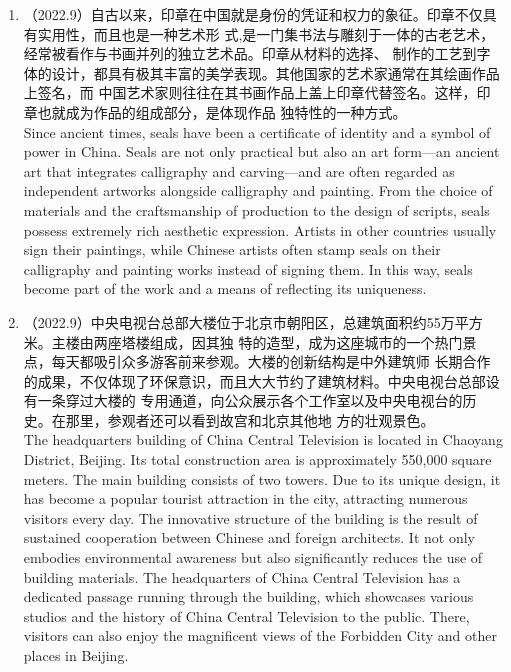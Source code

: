 ﻿\documentclass[lang=cn,11pt]{elegantbook}
\begin{document}
\begin{enumerate}
    \item （2022.9）自古以来，印章在中国就是身份的凭证和权力的象征。印章不仅具有实用性，而且也是一种艺术形 式,是一门集书法与雕刻于一体的古老艺术，经常被看作与书画并列的独立艺术品。印章从材料的选择、 制作的工艺到字体的设计，都具有极其丰富的美学表现。其他国家的艺术家通常在其绘画作品上签名，而 中国艺术家则往往在其书画作品上盖上印章代替签名。这样，印章也就成为作品的组成部分，是体现作品 独特性的一种方式。\\Since ancient times, seals have been a certificate of identity and a symbol of power in China. Seals are not only practical but also an art form—an ancient art that integrates calligraphy and carving—and are often regarded as independent artworks alongside calligraphy and painting. From the choice of materials and the craftsmanship of production to the design of scripts, seals possess extremely rich aesthetic expression. Artists in other countries usually sign their paintings, while Chinese artists often stamp seals on their calligraphy and painting works instead of signing them. In this way, seals become part of the work and a means of reflecting its uniqueness.
    \item （2022.9）中央电视台总部大楼位于北京市朝阳区，总建筑面积约55万平方米。主楼由两座塔楼组成，因其独 特的造型，成为这座城市的一个热门景点，每天都吸引众多游客前来参观。大楼的创新结构是中外建筑师 长期合作的成果，不仅体现了环保意识，而且大大节约了建筑材料。中央电视台总部设有一条穿过大楼的 专用通道，向公众展示各个工作室以及中央电视台的历史。在那里，参观者还可以看到故宫和北京其他地 方的壮观景色。\\The headquarters building of China Central Television is located in Chaoyang District, Beijing. Its total construction area is approximately 550,000 square meters. The main building consists of two towers. Due to its unique design, it has become a popular tourist attraction in the city, attracting numerous visitors every day. The innovative structure of the building is the result of sustained cooperation between Chinese and foreign architects. It not only embodies environmental awareness but also significantly reduces the use of building materials. The headquarters of China Central Television has a dedicated passage running through the building, which showcases various studios and the history of China Central Television to the public. There, visitors can also enjoy the magnificent views of the Forbidden City and other places in Beijing.

\end{enumerate}
\end{document}
